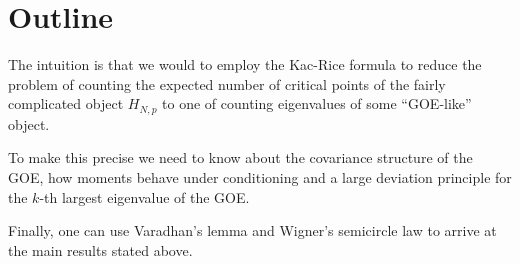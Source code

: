 \section{Outline}

The intuition is that we would to employ the Kac-Rice formula to reduce the problem of counting the expected number of critical points of the fairly complicated object $H_{N,p}$ to one of counting eigenvalues of some ``GOE-like'' object.

To make this precise we need to know about the covariance structure of the GOE, how moments behave under conditioning and a large deviation principle for the $k$-th largest eigenvalue of the GOE.

Finally, one can use Varadhan's lemma and Wigner's semicircle law to arrive at the main results stated above.






